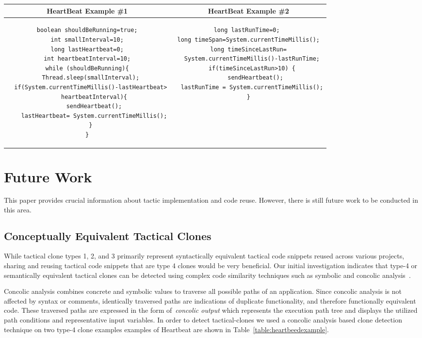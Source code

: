 \noindent
\vspace{-2pt}
\begin{table*}[ht]
\caption{An Example HeartBeat Tactical Clone~\label{table:heartbeedexample}}
\centering
\begin{tabular}{c | c}
\bfseries HeartBeat Example \#1  & \bfseries HeartBeat Example \#2  \\ \hline \hline
\begin{lstlisting}
boolean shouldBeRunning=true;
int smallInterval=10;
long lastHeartbeat=0;
int heartbeatInterval=10;
while (shouldBeRunning){
  Thread.sleep(smallInterval);
  if(System.currentTimeMillis()-lastHeartbeat>
    heartbeatInterval){
    sendHeartbeat();
    lastHeartbeat= System.currentTimeMillis();
  }
}
\end{lstlisting}
&
\begin{lstlisting}
long lastRunTime=0; 
long timeSpan=System.currentTimeMillis();
long timeSinceLastRun=
  System.currentTimeMillis()-lastRunTime;
  if(timeSinceLastRun>10) {
    sendHeartbeat();
  lastRunTime = System.currentTimeMillis();
}
\end{lstlisting} 
\end{tabular}
\vspace{-2pt}
\end{table*}


\vspace{-10pt}
\section{Future Work}
\label{sec:Future}
This paper provides crucial information about tactic implementation and code reuse. However, there is still future work to be conducted in this area.

\subsection{Conceptually Equivalent Tactical Clones}
While tactical clone types 1, 2, and 3 primarily represent syntactically equivalent tactical code snippets reused across various projects, sharing and reusing tactical code snippets that are type 4 clones would be very beneficial. Our initial investigation indicates that type-4 or semantically equivalent tactical clones can be detected using complex code similarity techniques such as symbolic and concolic analysis~\cite{wcre2013, Dan123}.

Concolic analysis combines concrete and symbolic values to traverse all possible paths of an application. Since concolic analysis is not affected by syntax or comments, identically traversed paths are indications of duplicate functionality, and therefore functionally equivalent code. These traversed paths are expressed in the form of~\emph{concolic output} which represents the execution path tree and displays the utilized path conditions and representative input variables. In order to detect tactical-clones we used a concolic analysis based clone detection technique \cite{wcre2013,Dan123, Krutz:2015:EEU:2695664.2695929} on two type-4 clone examples examples of Heartbeat are shown in Table~\ref{table:heartbeedexample}.

